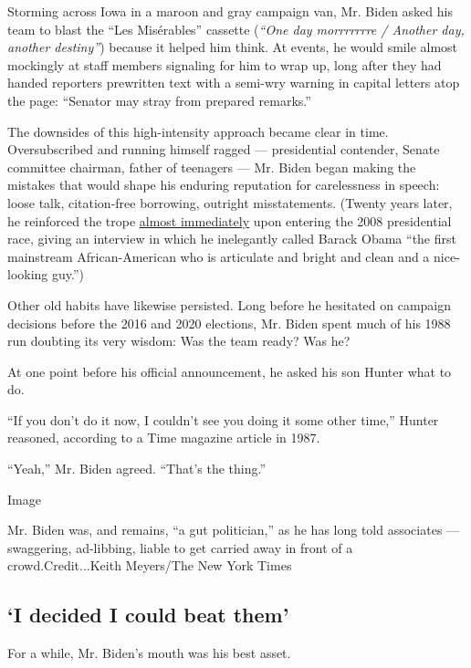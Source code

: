Storming across Iowa in a maroon and gray campaign van, Mr. Biden asked
his team to blast the ``Les Misérables'' cassette (\emph{``One day
morrrrrrre / Another day, another destiny''}) because it helped him
think. At events, he would smile almost mockingly at staff members
signaling for him to wrap up, long after they had handed reporters
prewritten text with a semi-wry warning in capital letters atop the
page: ``Senator may stray from prepared remarks.''

The downsides of this high-intensity approach became clear in time.
Oversubscribed and running himself ragged --- presidential contender,
Senate committee chairman, father of teenagers --- Mr. Biden began
making the mistakes that would shape his enduring reputation for
carelessness in speech: loose talk, citation-free borrowing, outright
misstatements. (Twenty years later, he reinforced the trope
\href{https://www.nytimes3xbfgragh.onion/2007/02/01/us/politics/01biden.html}{almost
immediately} upon entering the 2008 presidential race, giving an
interview in which he inelegantly called Barack Obama ``the first
mainstream African-American who is articulate and bright and clean and a
nice-looking guy.'')

Other old habits have likewise persisted. Long before he hesitated on
campaign decisions before the 2016 and 2020 elections, Mr. Biden spent
much of his 1988 run doubting its very wisdom: Was the team ready? Was
he?

At one point before his official announcement, he asked his son Hunter
what to do.

``If you don't do it now, I couldn't see you doing it some other time,''
Hunter reasoned, according to a Time magazine article in 1987.

``Yeah,'' Mr. Biden agreed. ``That's the thing.''

Image

Mr. Biden was, and remains, ``a gut politician,'' as he has long told
associates --- swaggering, ad-libbing, liable to get carried away in
front of a crowd.Credit...Keith Meyers/The New York Times

\hypertarget{i-decided-i-could-beat-them}{%
\subsection{`I decided I could beat
them'}\label{i-decided-i-could-beat-them}}

For a while, Mr. Biden's mouth was his best asset.

